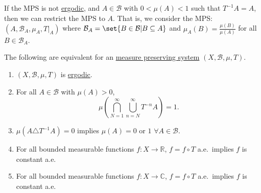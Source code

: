 \documentclass{article}
\begin{document}
If the MPS is not \hyperlink{def:ergodic}{ergodic}, and $A \in \mathcal{B}$ with $0 < \mu(A) < 1$ such that $T^{-1} A = A$, then we can restrict the MPS to $A$.
That is, we consider the MPS: $(A, \mathcal{B}_A, \mu_A, T|_A)$ where $\mathcal{B}_A = \set{B \in \mathcal{B} | B \subseteq A}$ and $\mu_A(B) = \frac{\mu(B)}{\mu(A)}$ for all $B \in \mathcal{B}_A$.
\begin{thm}
  The following are equivalent for an \hyperlink{def:mps}{measure preserving system} $(X, \mathcal{B}, \mu,T)$.
  \begin{enumerate}[label=(\arabic*)]
    \item $(X, \mathcal{B}, \mu, T)$ is \hyperlink{def:ergodic}{ergodic}.
    \item For all $A \in \mathcal{B}$ with $\mu(A) > 0$,
      \begin{equation*}
        \mu(\bigcap_{N=1}^\infty \bigcup_{n=N}^\infty T^{-n} A) = 1.
      \end{equation*}
    \item $\mu(A \triangle T^{-1} A) = 0$ implies $\mu(A) = 0$ or $1$ $\forall A \in \mathcal{B}$.
    \item For all bounded measurable functions $f: X \to \mathbb{R}$,
      $f = f \circ T$ a.e.\ implies $f$ is constant a.e.
    \item For all bounded measurable functions $f: X \to \mathbb{C}$,
      $f = f \circ T$ a.e.\ implies $f$ is constant a.e.
  \end{enumerate}
\end{thm}
\end{document}
